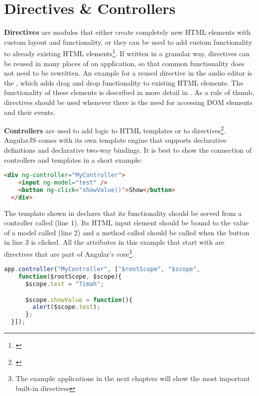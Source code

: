\section{Directives \& Controllers}

\textbf{Directives} are modules that either create completely new HTML elements with custom layout and functionality, or they can be used to add custom functionality to already existing HTML elements\footnote{\cite[p. 61ff]{lerner2013ngbook}}. If written in a granular way, directives can be reused in many places of an application, so that common functionality does not need to be rewritten. An example for a reused directive in the audio editor is the , which adds drag and drop functionality to existing HTML elements. The functionality of these elements is described in more detail in . As a rule of thumb, directives should be used whenever there is the need for accessing DOM elements and their events.

\textbf{Controllers} are used to add logic to HTML templates or to directives\footnote{\cite[p. 25ff]{lerner2013ngbook}}. AngularJS comes with its own template engine that supports declarative definitions and declarative two-way bindings. It is best to show the connection of controllers and templates in a short example:

\begin{lstlisting}[language=HTML, caption=A simple AngularJS template, label=lst:angular-template]
  <div ng-controller="MyController">
    <input ng-model="test" />
    <button ng-click="showValue()">Show</button>
  </div>
\end{lstlisting}

The template shown in  declares that its functionality should be served from a controller called  (line 1). Its HTML input element should be bound to the value of a model called  (line 2) and a method called  should be called when the button in line 3 is clicked. All the attributes in this example that start with  are directives that are part of Angular's core\footnote{The example applications in the next chapters will show the most important built-in directives}.

\begin{lstlisting}[language=JavaScript, caption=A simple AngularJS controller, label=lst:angular-controller]
  app.controller("MyController", ["$rootScope", "$scope",
    function($rootScope, $scope){
      $scope.test = "Timah";

      $scope.showValue = function(){
        alert($scope.test);
      };
  }]);
\end{lstlisting}

